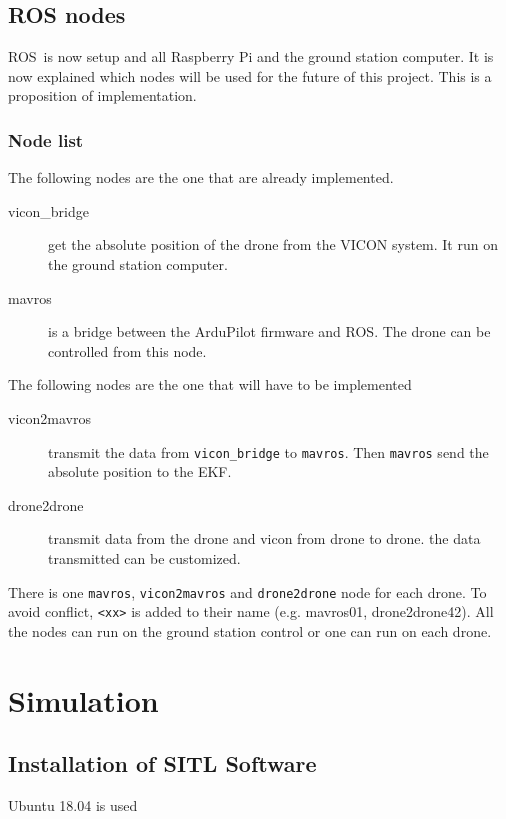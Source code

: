 \subsection{ROS nodes}
ROS is now setup and all Raspberry Pi and the ground station computer.
It is now explained which nodes will be used for the future of this project.
This is a proposition of implementation.

\subsubsection{Node list}

The following nodes are the one that are already implemented.

\begin{description}
    \item[vicon\_bridge] get the absolute position of the drone from the VICON system.
          It run on the ground station computer.
    \item[mavros] is a bridge between the ArduPilot firmware and ROS.
          The drone can be controlled from this node.
\end{description}

The following nodes are the one that will have to be implemented

\begin{description}
    \item[vicon2mavros] transmit the data from \texttt{vicon\_bridge} to \texttt{mavros}.
          Then \texttt{mavros} send the absolute position to the EKF.
    \item[drone2drone] transmit data from the drone and vicon from drone to drone.
          the data transmitted can be customized.
\end{description}

There is one \texttt{mavros}, \texttt{vicon2mavros} and \texttt{drone2drone}
node for each drone. To avoid conflict, \texttt{<xx>} is added to their name (e.g. mavros01, drone2drone42).
All the nodes can run on the ground station control or one can run on each drone.

\section{Simulation}

\subsection{Installation of SITL Software}
Ubuntu 18.04 is used

